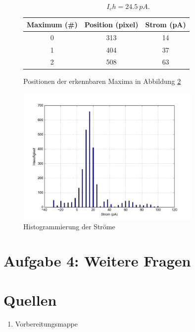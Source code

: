 \documentclass[a4paper,ngerman]{scrartcl}
\begin{document}
\begin{equation}
I_ch = \SI{24.5}{pA} .
\end{equation}



\begin{figure}
\begin{tabular}{ccc}
Maximum (#)	&	Position (pixel)	&	Strom (pA) \\
\hline
0	&	313	&	14	\\
1	&	404	&	37	\\
2	&	508	&	63	\\
\end{tabular}
\caption{Positionen der erkennbaren Maxima in Abbildung \ref{fig:mehrkanal-histo}}
\label{tab:mehrkanal-maxima}
\end{figure}

\begin{figure}[tbh!]
\includegraphics[width=0.8\textwidth]{abbildungen/mehrkanal_histo.png}
\caption{Histogrammierung der Ströme}
\label{fig:mehrkanal-histo}
\end{figure}




\section{Aufgabe 4: Weitere Fragen}






\section{Quellen}
\begin{enumerate}
\item Vorbereitungsmappe \label{ref:mappe}
\end{enumerate}
\end{document}
